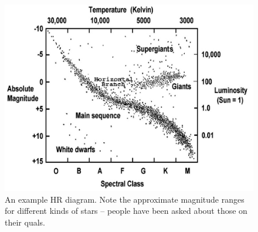 \begin{figure}[ht]
\centering
\includegraphics[width=\textwidth]{stars_hr_diagram}
\caption{An example HR diagram. Note the approximate magnitude ranges for different kinds
         of stars -- people have been asked about those on their quals.}
\label{fig:hr_diagram}
\end{figure}

